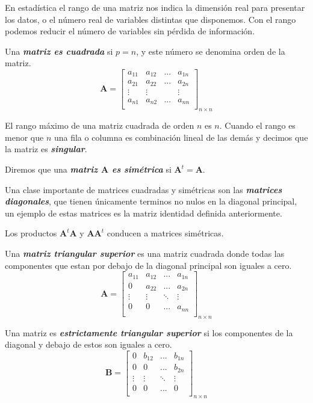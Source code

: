 \documentclass[12pt,letterpaper]{report} %
\begin{document}
En estadística el rango de una matriz nos indica la dimensión real para presentar los datos, o  el número real de variables distintas que disponemos. Con el rango podemos reducir el número de variables sin pérdida de información.

Una \textit{\textbf{matriz es cuadrada}} si $p=n$, y este número se denomina orden de la matriz.
$$
\mathbf{A}=
\begin{bmatrix}
a_{11} & a_{12} & ... & a_{1n} \\
a_{21} & a_{22} & ... & a_{2n} \\
\vdots & \vdots &     & \vdots \\
a_{n1} & a_{n2} & ... & a_{nn} \\
\end{bmatrix}_{n\times n}
$$

El rango máximo de una matriz cuadrada de orden $n$ es $n$. Cuando el rango es menor que $n$ una fila o columna es combinación lineal de las demás y decimos que la matriz es \textit{\textbf{singular}}.

Diremos que una \textit{\textbf{matriz $\mathbf{A}$ es simétrica}} si $\mathbf{A}^t=\mathbf{A}$.

Una clase importante de matrices cuadradas y simétricas son las \textit{\textbf{matrices diagonales}}, que tienen únicamente terminos no nulos en la diagonal principal, un ejemplo de estas matrices es la matriz identidad definida anteriormente.

Los productos $\mathbf{A}^t\mathbf{A}$ y $\mathbf{A}\mathbf{A}^t$ conducen a matrices simétricas.

Una \textit{\textbf{matriz triangular superior}} es una matriz cuadrada donde todas las componentes que estan por debajo de la diagonal principal son iguales a cero. 
$$
\mathbf{A}=
\begin{bmatrix}
a_{11} & a_{12} & ... & a_{1n} \\
0 & a_{22} & ... & a_{2n} \\
\vdots & \vdots & \ddots & \vdots \\
0 & 0 & ... & a_{nn} \\
\end{bmatrix}_{n\times n}
$$

Una matriz es \textit{\textbf{estrictamente triangular superior}} si los componentes de la diagonal y debajo de estos son iguales a cero.
$$
\mathbf{B}=
\begin{bmatrix}
0 & b_{12} & ... & b_{1n} \\
0 & 0 & ... & b_{2n} \\
\vdots & \vdots & \ddots & \vdots \\
0 & 0 & ... & 0 \\
\end{bmatrix}_{n\times n}
$$
\end{document}
